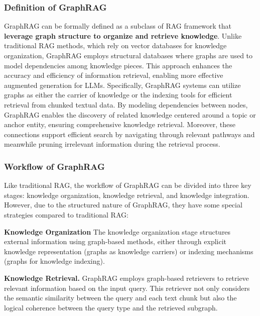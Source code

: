 \documentclass[lettersize,journal]{IEEEtran}
\begin{document}
\subsubsection{Definition of GraphRAG}
\label{def_graphrag}
GraphRAG can be formally defined as a subclass of RAG framework that  \textbf{leverage graph structure to organize and retrieve knowledge}. 
Unlike traditional RAG methods, which rely on vector databases for knowledge organization, GraphRAG employs structural databases where graphs are used to model dependencies among knowledge pieces.
This approach enhances the accuracy and efficiency of information retrieval, enabling more effective augmented generation for LLMs. Specifically, GraphRAG systems can utilize graphs as either the carrier of knowledge or the indexing tools for efficient retrieval from chunked textual data. 
By modeling dependencies between nodes, GraphRAG enables the discovery of related knowledge centered around a topic or anchor entity, ensuring comprehensive knowledge retrieval. Moreover, these connections support efficient search by navigating through relevant pathways and meanwhile pruning irrelevant information during the retrieval process.


\subsubsection{Workflow of GraphRAG}
Like traditional RAG, the workflow of GraphRAG can be divided into three key stages: knowledge organization, knowledge retrieval, and knowledge integration. However, due to the structured nature of GraphRAG, they have some special strategies compared to traditional RAG:

\noindent\textbf{Knowledge Organization} The knowledge organization stage structures external information using graph-based methods, either through explicit knowledge representation (graphs as knowledge carriers) or indexing mechanisms (graphs for knowledge indexing). 

\noindent\textbf{Knowledge Retrieval.} GraphRAG employs graph-based retrievers to retrieve relevant information based on the input query. This retriever not only considers the semantic similarity between the query and each text chunk but also the logical coherence between the query type and the retrieved subgraph.
\end{document}
